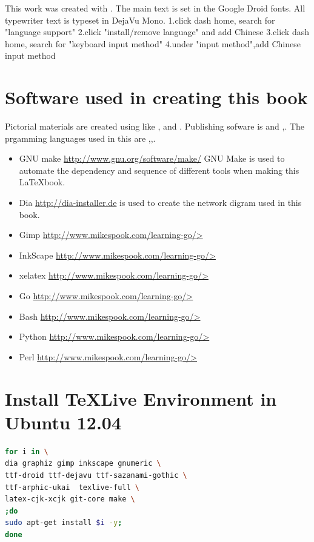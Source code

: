 \noindent{}This work was created with \XeLaTeX. The main text is set in
the Google Droid fonts. All typewriter text is typeset in DejaVu Mono.
1.click dash home, search for "language support"
2.click "install/remove language" and add Chinese
3.click dash home, search for "keyboard input method"
4.under "input method",add Chinese input method  

\section{Software used in creating this book}
\noindent{}Pictorial materials are created using  like ,  and . Publishing sofware is and ,. The prgamming languages used in this are ,,. 

\begin{itemize}
\item{GNU make \qquad\url{http://www.gnu.org/software/make/}}
GNU Make is used to automate the dependency and sequence of  different tools when making this \LaTeX  book.
\item{Dia  \qquad\url{http://dia-installer.de}}  is used to create the network digram used in this book.
\item{Gimp \qquad\url{http://www.mikespook.com/learning-go/>}}
\item{InkScape \qquad\url{http://www.mikespook.com/learning-go/>}}
\item{xelatex  \qquad\url{http://www.mikespook.com/learning-go/>}}
\item{Go  \qquad\url{http://www.mikespook.com/learning-go/>}}
\item{Bash  \qquad\url{http://www.mikespook.com/learning-go/>}}
\item{Python  \qquad\url{http://www.mikespook.com/learning-go/>}}
\item{Perl  \qquad\url{http://www.mikespook.com/learning-go/>}}

\end{itemize}

\section{Install \TeX Live Environment in Ubuntu 12.04}

\begin{lstlisting}[language=Bash]
for i in \
dia graphiz gimp inkscape gnumeric \
ttf-droid ttf-dejavu ttf-sazanami-gothic \
ttf-arphic-ukai  texlive-full \
latex-cjk-xcjk git-core make \
;do 
sudo apt-get install $i -y; 
done
\end{lstlisting}

